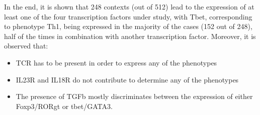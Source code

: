 In the end, it is shown that 248 contexts (out of 512) lead to the expression of at least one of the four transcription factors under study, with Tbet, corresponding to phenotype Th1, being expressed in the majority of the cases (152 out of 248), half of the times in combination with another transcription factor.
Moreover, it is observed that:
\begin{itemize}
	\item TCR has to be present in order to express any of the phenotypes
	\item IL23R and IL18R do not contribute to determine any of the phenotypes
	\item The presence of TGFb mostly discriminates between the expression of either Foxp3/RORgt or tbet/GATA3.
\end{itemize}


%
%

